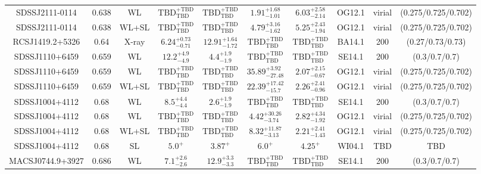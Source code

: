 \begin{table}
\begin{tabular}{cccccccccc}
SDSSJ2111-0114 & 0.638 & WL & ${\mathrm{TBD}}^{+\mathrm{TBD}}_{\mathrm{TBD}}$ & ${\mathrm{TBD}}^{+\mathrm{TBD}}_{\mathrm{TBD}}$ & ${1.91}^{+1.68}_{-1.01}$ & ${6.03}^{+2.58}_{-2.14}$ & OG12.1 & virial & (0.275/0.725/0.702) \\
SDSSJ2111-0114 & 0.638 & WL+SL & ${\mathrm{TBD}}^{+\mathrm{TBD}}_{\mathrm{TBD}}$ & ${\mathrm{TBD}}^{+\mathrm{TBD}}_{\mathrm{TBD}}$ & ${4.79}^{+3.16}_{-1.62}$ & ${5.25}^{+2.43}_{-1.94}$ & OG12.1 & virial & (0.275/0.725/0.702) \\
RCSJ1419.2+5326 & 0.64 & X-ray & ${6.24}^{+0.73}_{-0.71}$ & ${12.91}^{+1.64}_{-1.72}$ & ${\mathrm{TBD}}^{+\mathrm{TBD}}_{\mathrm{TBD}}$ & ${\mathrm{TBD}}^{+\mathrm{TBD}}_{\mathrm{TBD}}$ & BA14.1 & 200 & (0.27/0.73/0.73) \\
SDSSJ1110+6459 & 0.659 & WL & ${12.2}^{+4.9}_{-4.9}$ & ${4.4}^{+1.9}_{-1.9}$ & ${\mathrm{TBD}}^{+\mathrm{TBD}}_{\mathrm{TBD}}$ & ${\mathrm{TBD}}^{+\mathrm{TBD}}_{\mathrm{TBD}}$ & SE14.1 & 200 & (0.3/0.7/0.7) \\
SDSSJ1110+6459 & 0.659 & WL & ${\mathrm{TBD}}^{+\mathrm{TBD}}_{\mathrm{TBD}}$ & ${\mathrm{TBD}}^{+\mathrm{TBD}}_{\mathrm{TBD}}$ & ${35.89}^{+3.92}_{-27.48}$ & ${2.07}^{+2.15}_{-0.67}$ & OG12.1 & virial & (0.275/0.725/0.702) \\
SDSSJ1110+6459 & 0.659 & WL+SL & ${\mathrm{TBD}}^{+\mathrm{TBD}}_{\mathrm{TBD}}$ & ${\mathrm{TBD}}^{+\mathrm{TBD}}_{\mathrm{TBD}}$ & ${22.39}^{+17.42}_{-15.7}$ & ${2.26}^{+2.41}_{-0.96}$ & OG12.1 & virial & (0.275/0.725/0.702) \\
SDSSJ1004+4112 & 0.68 & WL & ${8.5}^{+4.4}_{-4.4}$ & ${2.6}^{+1.9}_{-1.9}$ & ${\mathrm{TBD}}^{+\mathrm{TBD}}_{\mathrm{TBD}}$ & ${\mathrm{TBD}}^{+\mathrm{TBD}}_{\mathrm{TBD}}$ & SE14.1 & 200 & (0.3/0.7/0.7) \\
SDSSJ1004+4112 & 0.68 & WL & ${\mathrm{TBD}}^{+\mathrm{TBD}}_{\mathrm{TBD}}$ & ${\mathrm{TBD}}^{+\mathrm{TBD}}_{\mathrm{TBD}}$ & ${4.42}^{+30.26}_{-3.74}$ & ${2.82}^{+4.34}_{-1.92}$ & OG12.1 & virial & (0.275/0.725/0.702) \\
SDSSJ1004+4112 & 0.68 & WL+SL & ${\mathrm{TBD}}^{+\mathrm{TBD}}_{\mathrm{TBD}}$ & ${\mathrm{TBD}}^{+\mathrm{TBD}}_{\mathrm{TBD}}$ & ${8.32}^{+11.87}_{-3.13}$ & ${2.21}^{+2.41}_{-1.43}$ & OG12.1 & virial & (0.275/0.725/0.702) \\
SDSSJ1004+4112 & 0.68 & SL & ${5.0}^{+}_{}$ & ${3.87}^{+}_{}$ & ${6.0}^{+}_{}$ & ${4.25}^{+}_{}$ & WI04.1 & TBD & TBD \\
MACSJ0744.9+3927 & 0.686 & WL & ${7.1}^{+2.6}_{-2.6}$ & ${12.9}^{+3.3}_{-3.3}$ & ${\mathrm{TBD}}^{+\mathrm{TBD}}_{\mathrm{TBD}}$ & ${\mathrm{TBD}}^{+\mathrm{TBD}}_{\mathrm{TBD}}$ & SE14.1 & 200 & (0.3/0.7/0.7) \\

\end{tabular}
\end{table}
